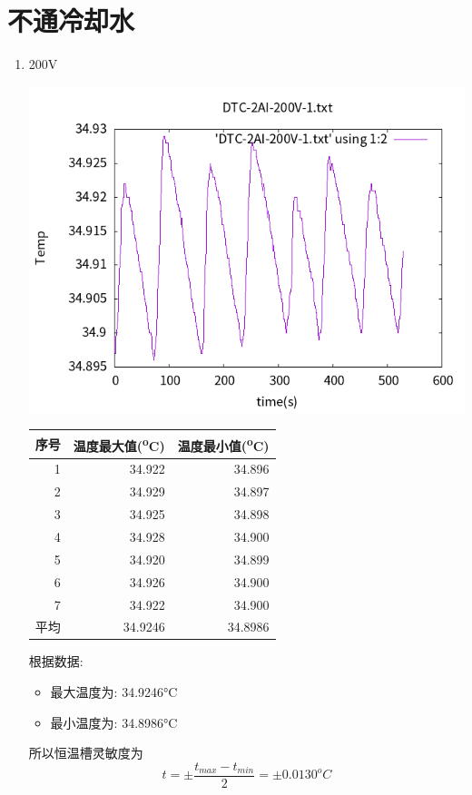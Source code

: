 \documentclass[11pt]{report}
\begin{document}
\section{不通冷却水}
\label{sec:org5bbc6bf}
\begin{enumerate}
\item 200V
\label{sec:orgb6ab121}
\begin{center}
\includegraphics[width=.9\linewidth]{../img/DTC-2AI-200V-1.txt.png}
\end{center}

\begin{center}
\begin{tabular}{rrr}
序号 & 温度最大值(\textsuperscript{o}C) & 温度最小值(\textsuperscript{o}C)\\
\hline
1 & 34.922 & 34.896\\
2 & 34.929 & 34.897\\
3 & 34.925 & 34.898\\
4 & 34.928 & 34.900\\
5 & 34.920 & 34.899\\
6 & 34.926 & 34.900\\
7 & 34.922 & 34.900\\
平均 & 34.9246 & 34.8986\\
\end{tabular}
\end{center}

根据数据:
\begin{itemize}
\item 最大温度为: 34.9246°C
\item 最小温度为: 34.8986°C
\end{itemize}
所以恒温槽灵敏度为
\[
t=\pm\frac{t_{max}-t_{min}}{2}=\pm 0.0130^{o}C
\]



\end{enumerate}
\end{document}
